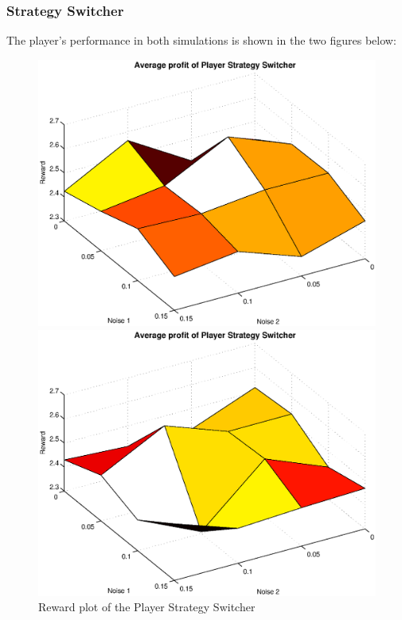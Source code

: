 \subsubsection{Strategy Switcher}
The player's performance in both simulations is shown in the two figures below:
\begin{figure}[h]

\begin{minipage}[hbt]{0.65\textwidth}
	\centering
	\includegraphics[width=\textwidth]{pics/simulation1/Reward_vs_Noise_of_Player_Strategy_Switcher}
\end{minipage}
\hfill
\begin{minipage}[hbt]{0.3\textwidth}
	\centering
	\includegraphics[width=\textwidth]{pics/simulation2/Reward_vs_Noise_of_Player_Strategy_Switcher}
\end{minipage}
	\caption{Reward plot of the Player Strategy Switcher}
	\label{pic player ss}
\end{figure}

